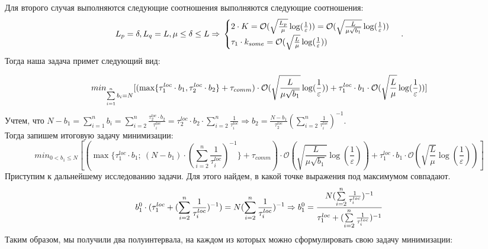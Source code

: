 \documentclass{article}
\begin{document}
 Для второго случая выполняются следующие соотношения выполняются следующие соотношения:
\begin{equation}
    \notag
    L_p = \delta, L_q = L, \mu \leq \delta \leq L \Rightarrow 
    \\
    \notag
    \begin{cases}
      2\cdot K = \mathcal O(\sqrt{\frac{L_p}{\mu}}\log(\frac{1}{\varepsilon}))  = \mathcal O(\sqrt{\frac{L}{\mu \sqrt{b_1}}}\log(\frac{1}{\varepsilon}))\\
      \tau_1\cdot k_{some} = \mathcal O(\sqrt{\frac{L}{\mu}}\log(\frac{1}{\varepsilon}))
    \end{cases}\,.
\end{equation}
Тогда наша задача примет следующий вид: 

\begin{equation}
    \notag
    min_{\sum\limits_{i = 1}^{n} b_i = N}[(\max\{\tau_1^{loc}\cdot b_1, \tau_2^{loc}\cdot b_2\} + \tau_{comm}) \cdot \mathcal O(\sqrt{\frac{L}{\mu \sqrt{b_1}}}\log(\frac{1}{\varepsilon})) + \tau_1^{loc}\cdot b_1 \cdot \mathcal O(\sqrt{\frac{L}{\mu}}\log(\frac{1}{\varepsilon}))]
\end{equation}
Учтем, что $ N - b_1 = \sum\limits_{i = 1}^{n} b_i = \sum\limits_{i = 2}^{n} \frac{\tau_2^{loc}\cdot b_2}{\tau_i^{loc}} = \tau_2^{loc}\cdot b_2 \cdot \sum\limits_{i = 2}^{n} \frac{1}{\tau_i^{loc}} \Rightarrow
b_2 = \frac{N - b_1}{\tau_2 ^{loc}}(\sum\limits_{i = 2}^{n} \frac{1}{\tau_i^{loc}})^{-1}$. 
\\Тогда запишем итоговую задачу минимизации:
\begin{equation}
     \label{eq:7}
    min_{0 < b_1 \leq N}[(\max\{\tau_1^{loc}\cdot b_1; ~(N-b_1) \cdot (\sum\limits_{i = 2}^{n} \frac{1}{\tau_i^{loc}} )^{-1}\} + \tau_{comm}) \cdot \mathcal O(\sqrt{\frac{L}{\mu \sqrt{b_1}}}\log(\frac{1}{\varepsilon})) + \tau_1^{loc}\cdot b_1 \cdot \mathcal O(\sqrt{\frac{L}{\mu}}\log(\frac{1}{\varepsilon}))] 
\end{equation}
Приступим к дальнейшему исследованию задачи. Для этого найдем, в какой точке выражения под максимумом совпадают. 
\begin{equation}
    \notag
    b_1^0 \cdot (\tau_1^{loc} + (\sum\limits_{i = 2}^{n} \frac{1}{\tau_i^{loc}})^{-1}) = N (\sum\limits_{i = 2}^{n} \frac{1}{\tau_i^{loc}})^{-1} \Rightarrow b_1^0 = \frac{N (\sum\limits_{i = 2}^{n} \frac{1}{\tau_i^{loc}})^{-1}}{\tau_1^{loc} + (\sum\limits_{i = 2}^{n} \frac{1}{\tau_i^{loc}})^{-1}}
\end{equation}
Таким образом, мы получили два полуинтервала, на каждом из которых можно сформулировать свою задачу минимизации:
\end{document}
